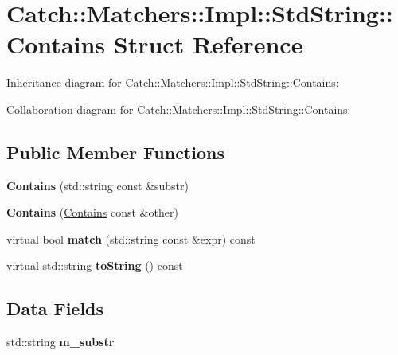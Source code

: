 \hypertarget{structCatch_1_1Matchers_1_1Impl_1_1StdString_1_1Contains}{}\section{Catch\+:\+:Matchers\+:\+:Impl\+:\+:Std\+String\+:\+:Contains Struct Reference}
\label{structCatch_1_1Matchers_1_1Impl_1_1StdString_1_1Contains}


Inheritance diagram for Catch\+:\+:Matchers\+:\+:Impl\+:\+:Std\+String\+:\+:Contains\+:


Collaboration diagram for Catch\+:\+:Matchers\+:\+:Impl\+:\+:Std\+String\+:\+:Contains\+:
\subsection*{Public Member Functions}
\begin{DoxyCompactItemize}
\item 
{\bfseries Contains} (std\+::string const \&substr)\hypertarget{structCatch_1_1Matchers_1_1Impl_1_1StdString_1_1Contains_ac6f13133724bfd5796e8ee4ea8f2c0e3}{}\label{structCatch_1_1Matchers_1_1Impl_1_1StdString_1_1Contains_ac6f13133724bfd5796e8ee4ea8f2c0e3}

\item 
{\bfseries Contains} (\hyperlink{structCatch_1_1Matchers_1_1Impl_1_1StdString_1_1Contains}{Contains} const \&other)\hypertarget{structCatch_1_1Matchers_1_1Impl_1_1StdString_1_1Contains_ad6b1ef653dfcb3bab43c43be043dc4e8}{}\label{structCatch_1_1Matchers_1_1Impl_1_1StdString_1_1Contains_ad6b1ef653dfcb3bab43c43be043dc4e8}

\item 
virtual bool {\bfseries match} (std\+::string const \&expr) const \hypertarget{structCatch_1_1Matchers_1_1Impl_1_1StdString_1_1Contains_aa27d823dea5770025a24424fc3355a6f}{}\label{structCatch_1_1Matchers_1_1Impl_1_1StdString_1_1Contains_aa27d823dea5770025a24424fc3355a6f}

\item 
virtual std\+::string {\bfseries to\+String} () const \hypertarget{structCatch_1_1Matchers_1_1Impl_1_1StdString_1_1Contains_a226755351f3598179925f3ab89d6def7}{}\label{structCatch_1_1Matchers_1_1Impl_1_1StdString_1_1Contains_a226755351f3598179925f3ab89d6def7}

\end{DoxyCompactItemize}
\subsection*{Data Fields}
\begin{DoxyCompactItemize}
\item 
std\+::string {\bfseries m\+\_\+substr}\hypertarget{structCatch_1_1Matchers_1_1Impl_1_1StdString_1_1Contains_a0bad82dd7cbdd0ec06b6d562181db03e}{}\label{structCatch_1_1Matchers_1_1Impl_1_1StdString_1_1Contains_a0bad82dd7cbdd0ec06b6d562181db03e}

\end{DoxyCompactItemize}
